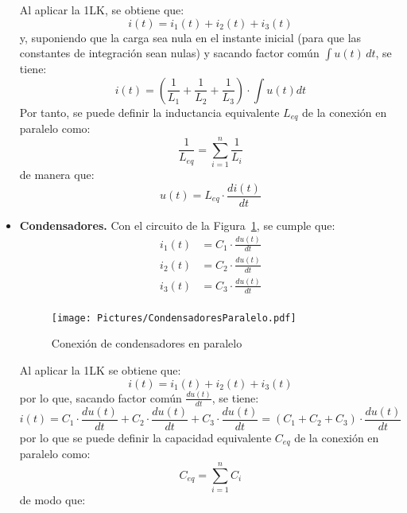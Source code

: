 \documentclass[11pt]{book} %
\numberwithin{dummy}{section}
\theoremstyle{ocrenumbox}
\theoremstyle{blacknumex}
\theoremstyle{blacknumbox}
\theoremstyle{ocrenum}
\begin{document}
\begin{itemize}
		Al aplicar la 1LK, se obtiene que: 
		\begin{equation*}
			i(t) = i_1(t) + i_2(t) + i_3(t)
		\end{equation*}
		y, suponiendo que la carga sea nula en el instante inicial (para que las constantes de integración sean nulas) y sacando factor común $\int u(t)\,dt$, se tiene:
		\begin{equation*}
			i(t)=\left(\dfrac{1}{L_1}+\dfrac{1}{L_2}+\dfrac{1}{L_3} \right)\cdot \int u(t) dt
		\end{equation*}
		Por tanto, se puede definir la inductancia equivalente $L_{eq}$ de la conexión en paralelo como:
		\begin{equation}
			\boxed{\dfrac{1}{L_{eq}} = \sum_{i = 1}^n \dfrac{1}{L_i}}
		\end{equation}
		de manera que:
		\begin{equation*}
			u(t) = L_{eq} \cdot \dfrac{di(t)}{dt}
		\end{equation*}
		\item \textbf{Condensadores.} Con el circuito de la Figura~\ref{fig.condensadores-paralelo}, se cumple que:
		\begin{align*}
			i_1(t) &= C_1 \cdot \frac{du(t)}{dt}\\
			i_2(t) &= C_2 \cdot \frac{du(t)}{dt}\\
			i_3(t) &= C_3 \cdot \frac{du(t)}{dt}\\
		\end{align*}
		\begin{figure}[htbp]
			\centering
			\texttt{[image: Pictures/CondensadoresParalelo.pdf]}
			\caption{Conexión de condensadores en paralelo}
			\label{fig.condensadores-paralelo}
		\end{figure}
		Al aplicar la 1LK se obtiene que: 
		\begin{equation*}
			i(t) = i_1(t) + i_2(t) + i_3(t)
		\end{equation*}
		por lo que, sacando factor común $\frac{du(t)}{dt}$, se tiene:
		\begin{equation*}
			i(t)=C_1\cdot \dfrac{du(t)}{dt}+ C_2\cdot \dfrac{du(t)}{dt}+ C_3\cdot \dfrac{du(t)}{dt}=(C_1+C_2+C_3)\cdot\dfrac{du(t)}{dt}
		\end{equation*}
		por lo que se puede definir la capacidad equivalente $C_{eq}$ de la conexión en paralelo como:
		\begin{equation}
			\boxed{C_{eq} = \sum_{i = 1}^n C_i}
		\end{equation}
		de modo que:
		\begin{equation*}

\end{equation*}
\end{itemize}
\end{document}
